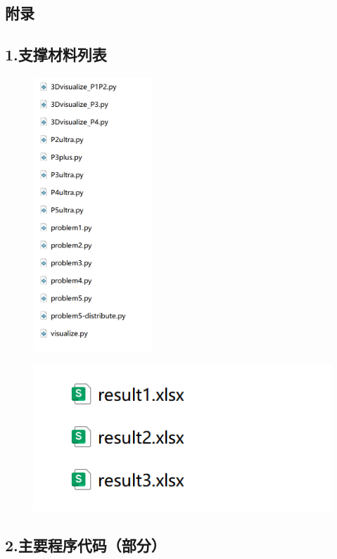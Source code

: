 \documentclass[12pt]{article}
\begin{document}
\begin{CJK}{UTF8}{gbsn}
		\setcounter{page}{1} %
		
		
		\section*{附录}
		
		\subsection*{1.支撑材料列表}
		
		\begin{figure}[H]
			\includegraphics[width=0.4\textwidth]{pic/zhicheng.png}
		\end{figure}		
		
		\begin{figure}[H]
			\includegraphics[width=0.4\linewidth]{pic/zc2}
		\end{figure}
		
		\newpage
		\subsection*{2.主要程序代码（部分）}
		
		
	\end{CJK}
\end{document}
